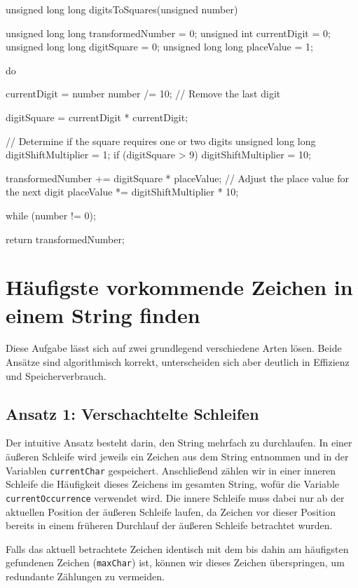\begin{codebox}[lang=c, fontsize=\small]
unsigned long long digitsToSquares(unsigned number) {
    unsigned long long transformedNumber = 0;
    unsigned int currentDigit = 0;
    unsigned long long digitSquare = 0;
    unsigned long long placeValue = 1;

    do {
        currentDigit = number %
        number /= 10;               // Remove the last digit

        digitSquare = currentDigit * currentDigit;

        // Determine if the square requires one or two digits
        unsigned long long digitShiftMultiplier = 1;
        if (digitSquare > 9)
            digitShiftMultiplier = 10;

        transformedNumber += digitSquare * placeValue;
        // Adjust the place value for the next digit
        placeValue *= digitShiftMultiplier * 10;
    } while (number != 0);

    return transformedNumber;
}
\end{codebox}




\chapter{Häufigste vorkommende Zeichen in einem String finden}

Diese Aufgabe lässt sich auf zwei grundlegend verschiedene Arten lösen. Beide
Ansätze sind algorithmisch korrekt, unterscheiden sich aber deutlich in
Effizienz und Speicherverbrauch.

\section*{Ansatz 1: Verschachtelte Schleifen}

Der intuitive Ansatz besteht darin, den String mehrfach zu durchlaufen. In einer
äußeren Schleife wird jeweils ein Zeichen aus dem String entnommen und in der
Variablen \texttt{currentChar} gespeichert. Anschließend zählen wir in
einer inneren Schleife die Häufigkeit dieses Zeichens im gesamten String, wofür
die Variable \texttt{currentOccurrence} verwendet wird. Die innere
Schleife muss dabei nur ab der aktuellen Position der äußeren Schleife laufen,
da Zeichen vor dieser Position bereits in einem früheren Durchlauf der äußeren
Schleife betrachtet wurden.

Falls das aktuell betrachtete Zeichen identisch mit dem bis dahin am häufigsten
gefundenen Zeichen (\texttt{maxChar}) ist, können wir dieses Zeichen
überspringen, um redundante Zählungen zu vermeiden.

